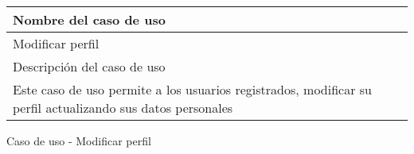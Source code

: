 \begin{identificacionCasoDeUso}
	\begin{tabular} { | p{17cm} |}

		\hline
		Nombre del caso de uso                                                                                     \\ \hline
		Modificar perfil                                                                                           \\ \hline
		Descripción del caso de uso                                                                                \\ \hline
		Este caso de uso permite a los usuarios registrados, modificar su perfil actualizando sus datos personales \\ \hline
	\end{tabular}
	\caption{Caso de uso - Modificar perfil}
\end{identificacionCasoDeUso}